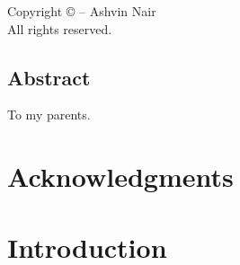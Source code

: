\documentclass[ titlepage,numbers=noenddot,headinclude,
                footinclude=true,cleardoublepage=empty,abstractoff,
                BCOR=5mm,paper=letter,fontsize=12pt,
                american,
                openany
                ]{scrreprt}
\newcommand\blankpage{%
    \null
    \thispagestyle{empty}%
    \addtocounter{page}{-1}%
    \newpage}
\begin{document}
\frenchspacing
\raggedbottom
{}





\null
\begin{center}
    \thispagestyle{empty}
    \vspace*{\fill}
    Copyright \copyright {} -- Ashvin Nair\\
All rights reserved.
    \vspace*{\fill}
\end{center}
\newpage

\setcounter{page}{1}
\section*{Abstract}


\clearpage
\begin{center}
    \thispagestyle{empty}
    \vspace*{\fill}
    To my parents.
    \vspace*{\fill}
\end{center}
\clearpage

\newpage

\setcounter{page}{1}%

\begingroup
\let\clearpage\relax
\let\cleardoublepage\relax
\let\cleardoublepage\relax
\chapter*{Acknowledgments}

\endgroup


\pagestyle{firstpage}



\setcounter{page}{1}

\chapter{Introduction}\label{chapter:intro}

\end{document}
